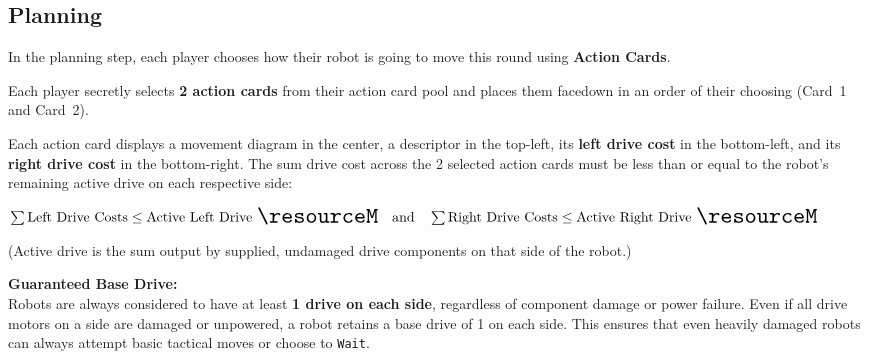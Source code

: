\documentclass[11pt,a4paper]{article}
\newcommand{\inlineIcon}[1]{\raisebox{-0.22ex}{\resizebox{!}{1.15em}{#1}}}
\begin{document}
\subsection{Planning}
In the planning step, each player chooses how their robot is going to move this round using \textbf{Action Cards}.

Each player secretly selects \textbf{2 action cards} from their action card pool and places them facedown in an order of their choosing (Card~1 and Card~2).

Each action card displays a movement diagram in the center, a descriptor in the top-left, its \textbf{left drive cost} in the bottom-left, and its \textbf{right drive cost} in the bottom-right.
The sum drive cost across the 2 selected action cards must be less than or equal to the robot's remaining active drive \inlineIcon{\resourceM} on each respective side:
\begin{center}
  {\small\bfseries
  $\sum \text{Left Drive Costs} \le \text{Active Left Drive } \inlineIcon{\resourceM} \quad\text{and}\quad
   \sum \text{Right Drive Costs} \le \text{Active Right Drive } \inlineIcon{\resourceM}$}
\end{center}
\noindent(Active drive \inlineIcon{\resourceM} is the sum output by supplied, undamaged drive components on that side of the robot.)

\vspace{0.2em}
\noindent\textbf{Guaranteed Base Drive:}\\
Robots are always considered to have at least \textbf{1 drive on each side}, regardless of component damage or power failure. Even if all drive motors on a side are damaged or unpowered, a robot retains a base drive of 1 on each side. This ensures that even heavily damaged robots can always attempt basic tactical moves or choose to \texttt{Wait}.
\end{document}
